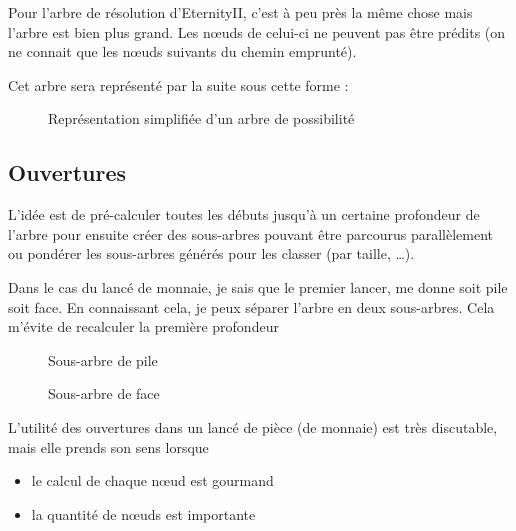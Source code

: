 	\begin{note}
		Pour l'arbre de résolution d'EternityII, c'est à peu près la même chose mais l'arbre est bien plus grand. Les n\oe uds de celui-ci ne peuvent pas être prédits (on ne connait que les n\oe uds suivants du chemin emprunté).
	\end{note}

	Cet arbre sera représenté par la suite sous cette forme :
	\begin{figure}[H]
	   	\begin{center}
	   			
	   	\end{center}
	   	
	   	\caption{Représentation simplifiée d'un arbre de possibilité}
	   	\label{fig:arbre}
	\end{figure}
	

	\subsection{Ouvertures}
	
	L'idée est de pré-calculer toutes les débuts jusqu'à un certaine profondeur de l'arbre pour ensuite créer des sous-arbres pouvant être parcourus parallèlement ou pondérer les sous-arbres générés pour les classer (par taille, \dots).
	
	\begin{exmp}
		Dans le cas du lancé de monnaie, je sais que le premier lancer, me donne soit pile soit face. En connaissant cela, je peux séparer l'arbre en deux sous-arbres. Cela m'évite de recalculer la première profondeur
		

		
		\begin{figure}[H]
			\begin{center}
				
			\end{center}
			\caption{Sous-arbre de pile}\label{fig:sous-arbre-pile}
			\endminipage\hfill
			\begin{center}
				
			\end{center}
			\caption{Sous-arbre de face}\label{fig:sous-arbre-face}
			\endminipage\hfill
		\end{figure}
	\end{exmp}
	
	\begin{rem}
		L'utilité des ouvertures dans un lancé de pièce (de monnaie) est très discutable, mais elle prends son sens lorsque
		
		\begin{itemize}
			\item le calcul de chaque n\oe ud est gourmand
			\item la quantité de n\oe uds est importante
		\end{itemize}  
	\end{rem}
	
